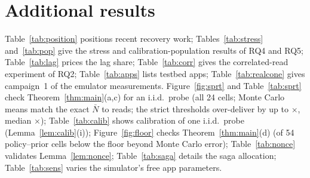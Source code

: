 \section{Additional results}
\label{app:extra}
Table~\ref{tab:position} positions recent recovery work; Tables~\ref{tab:stress} and~\ref{tab:pop} give the stress and calibration-population results of RQ4 and RQ5;
Table~\ref{tab:lag} prices the lag share; Table~\ref{tab:corr} gives the correlated-read experiment of RQ2; Table~\ref{tab:apps} lists testbed apps; Table~\ref{tab:realcone}
gives campaign~1 of the emulator measurements.
Figure~\ref{fig:sprt} and Table~\ref{tab:sprt} check Theorem~\ref{thm:main}(a,c) for an i.i.d.\ probe (all 24 cells; Monte Carlo means match the exact $\bar N$ to \SprtMCdev reads;
the strict thresholds over-deliver by up to \SprtSlackMax$\times$, median \SprtSlackMed$\times$); Table~\ref{tab:calib} shows calibration of one i.i.d.\ probe (Lemma~\ref{lem:calib}(i));
Figure~\ref{fig:floor} checks Theorem~\ref{thm:main}(d) (\ImpViol of 54 policy--prior cells below the floor beyond Monte Carlo error); Table~\ref{tab:nonce} validates Lemma~\ref{lem:nonce};
Table~\ref{tab:saga} details the saga allocation; Table~\ref{tab:sens} varies the simulator's free app parameters.
















\clearpage
